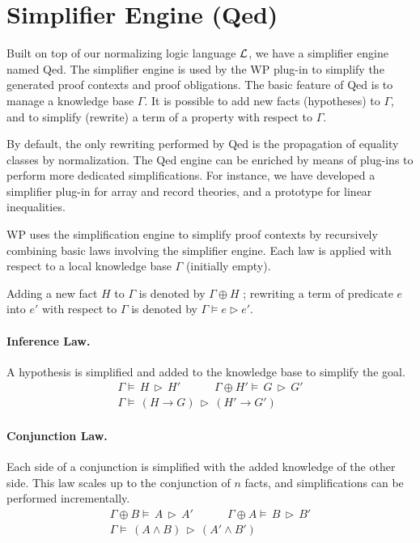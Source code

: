 \section{Simplifier Engine (Qed)}

Built on top of our normalizing logic language $\cal{L}$, we have a
simplifier engine named \textsf{Qed}\cite{qed}. The simplifier engine is used by
the \textsf{WP} plug-in to simplify the generated proof contexts and proof
obligations. The basic feature of \textsf{Qed} is to manage a knowledge
base $\Gamma$. It is possible to add new facts (hypotheses) to
$\Gamma$, and to simplify (rewrite) a term of a property with respect
to $\Gamma$.

By default, the only rewriting performed by \textsf{Qed} is the
propagation of equality classes by normalization. The \textsf{Qed}
engine can be enriched by means of plug-ins to perform more dedicated
simplifications. For instance, we have developed a simplifier plug-in
for array and record theories, and a prototype for linear inequalities.

\textsf{WP} uses the simplification engine to simplify proof contexts
by recursively combining basic laws involving the simplifier
engine. Each law is applied with respect to a local knowledge base
$\Gamma$ (initially empty).

\newcommand{\QED}[3]{#1\models\,#2\,\triangleright\,#3}
\newcommand{\LAW}[2]{\begin{array}{c}{#1}\\\hline{#2}\end{array}}
\newcommand{\AND}{\quad\quad\quad}

Adding a new fact $H$ to $\Gamma$ is denoted by $\Gamma\oplus H$ ;
rewriting a term of predicate $e$ into $e'$ with respect to $\Gamma$
is denoted by $\Gamma\models e\triangleright e'$.

\paragraph{Inference Law.} 
A hypothesis is simplified and added to the knowledge base to
simplify the goal.
\[\LAW%
 {\QED{\Gamma}{H}{H'}\AND\QED{\Gamma\oplus H'}{G}{G'}}%
 {\QED{\Gamma}{(H\rightarrow G)}{(H'\rightarrow G')}}
\]

\paragraph{Conjunction Law.}
Each side of a conjunction is simplified with the added knowledge of
the other side. This law scales up to the conjunction of $n$ facts,
and simplifications can be performed incrementally.
\[\LAW%
 {\QED{\Gamma\oplus B}{A}{A'}\AND\QED{\Gamma\oplus A}{B}{B'}}%
 {\QED{\Gamma}{(A\wedge B)}{(A'\wedge B')}}
\]


